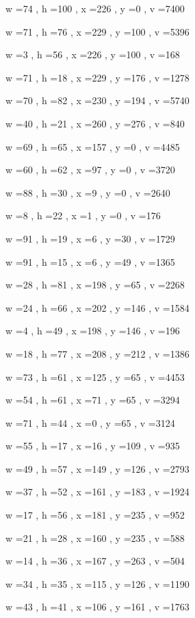 \documentclass[11pt]{article}
\begin{document}
w =74 , h =100 , x =226 , y =0 , v =7400
\par
w =71 , h =76 , x =229 , y =100 , v =5396
\par
w =3 , h =56 , x =226 , y =100 , v =168
\par
w =71 , h =18 , x =229 , y =176 , v =1278
\par
w =70 , h =82 , x =230 , y =194 , v =5740
\par
w =40 , h =21 , x =260 , y =276 , v =840
\par
w =69 , h =65 , x =157 , y =0 , v =4485
\par
w =60 , h =62 , x =97 , y =0 , v =3720
\par
w =88 , h =30 , x =9 , y =0 , v =2640
\par
w =8 , h =22 , x =1 , y =0 , v =176
\par
w =91 , h =19 , x =6 , y =30 , v =1729
\par
w =91 , h =15 , x =6 , y =49 , v =1365
\par
w =28 , h =81 , x =198 , y =65 , v =2268
\par
w =24 , h =66 , x =202 , y =146 , v =1584
\par
w =4 , h =49 , x =198 , y =146 , v =196
\par
w =18 , h =77 , x =208 , y =212 , v =1386
\par
w =73 , h =61 , x =125 , y =65 , v =4453
\par
w =54 , h =61 , x =71 , y =65 , v =3294
\par
w =71 , h =44 , x =0 , y =65 , v =3124
\par
w =55 , h =17 , x =16 , y =109 , v =935
\par
w =49 , h =57 , x =149 , y =126 , v =2793
\par
w =37 , h =52 , x =161 , y =183 , v =1924
\par
w =17 , h =56 , x =181 , y =235 , v =952
\par
w =21 , h =28 , x =160 , y =235 , v =588
\par
w =14 , h =36 , x =167 , y =263 , v =504
\par
w =34 , h =35 , x =115 , y =126 , v =1190
\par
w =43 , h =41 , x =106 , y =161 , v =1763
\par
\newpage
\end{document}

